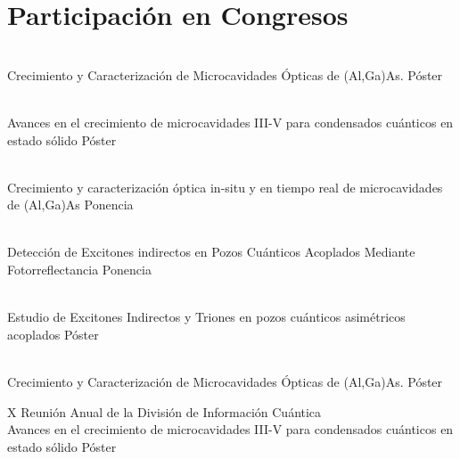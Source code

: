 \documentclass[letterpaper]{twentysecondcv} %
\begin{document}
\section{Participaci\'on en Congresos}

\begin{twenty} %
	                 {\\Crecimiento y Caracterización de Microcavidades Ópticas de (Al,Ga)As.}
                     {Póster}
                     
   {\\ Avances en el crecimiento de microcavidades III-V para condensados cuánticos en estado sólido}
   {Póster}
  

\end{twenty}



\begin{twenty}
	{\\ Crecimiento y caracterización óptica in-situ y en tiempo real de microcavidades de (Al,Ga)As}
	{Ponencia}
	
	{\\ Detección de Excitones indirectos en Pozos Cuánticos Acoplados Mediante Fotorreflectancia}
	{Ponencia}
	
	{\\Estudio de Excitones Indirectos y Triones en pozos cuánticos asimétricos acoplados}
	{Póster}
\end{twenty}


\begin{twenty} %
	                 {\\Crecimiento y Caracterización de Microcavidades Ópticas de (Al,Ga)As.}
                     {Póster}
                     
	{X Reunión Anual de la División de Información Cuántica}
    {\\ Avances en el crecimiento de microcavidades III-V para condensados cuánticos en estado sólido}
   {Póster}
  

\end{twenty}
\end{document}
